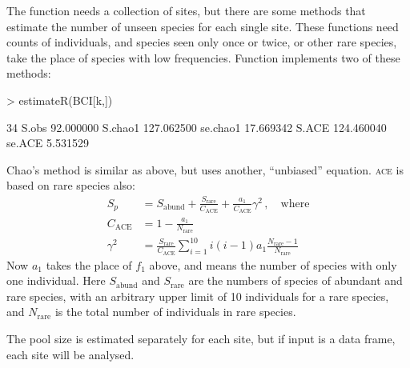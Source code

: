 \documentclass[a4paper,10pt,twocolumn]{article}
\begin{document}
The  function needs a collection of sites, but there
are some methods that estimate the number of unseen species for each
single site.  These functions need counts of individuals, and species
seen only once or twice, or other rare species, take the place of
species with low frequencies.  Function  implements
two of these methods:
\begin{Schunk}
\begin{Sinput}
> estimateR(BCI[k,])
\end{Sinput}
\begin{Soutput}
                 34
S.obs     92.000000
S.chao1  127.062500
se.chao1  17.669342
S.ACE    124.460040
se.ACE     5.531529
\end{Soutput}
\end{Schunk}
Chao's method is similar as above, but uses another, ``unbiased''
equation. \textsc{ace} is based on rare species also:
\begin{equation}
\begin{split}
S_p &= S_\mathrm{abund} + \frac{S_\mathrm{rare}}{C_\mathrm{ACE}} +
\frac{a_1}{C_\mathrm{ACE}} \gamma^2\, , \quad \text{where}\\
C_\mathrm{ACE} &= 1 - \frac{a_1}{N_\mathrm{rare}}\\
\gamma^2 &= \frac{S_\mathrm{rare}}{C_\mathrm{ACE}} \sum_{i=1}^{10} i
(i-1) a_1 \frac{N_\mathrm{rare} - 1}{N_\mathrm{rare}}
\end{split}
\end{equation}
Now $a_1$ takes the place of $f_1$ above, and means the number of
species with only one individual.
Here $S_\mathrm{abund}$ and $S_\mathrm{rare}$ are the numbers of
species of abundant and rare species, with an arbitrary upper limit of
10 individuals for a rare species, and $N_\mathrm{rare}$ is the total
number of individuals in rare species.

The pool size
is estimated separately for each site, but if input is a data frame,
each site will be analysed.
\end{document}

